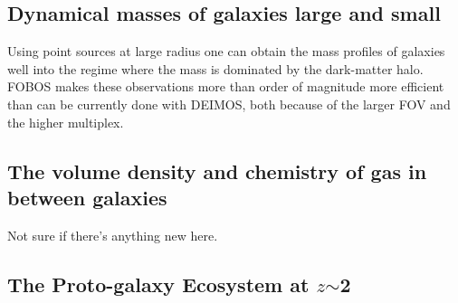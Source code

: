 
\subsection{Dynamical masses of galaxies large and small}

Using point sources at large radius one can obtain the mass profiles of galaxies well into the regime where the mass is dominated by the dark-matter halo.  FOBOS makes these observations more than order of magnitude more efficient than can be currently done with DEIMOS, both because of the larger FOV and the higher multiplex. 

\noindent{}

\subsection{The volume density and chemistry of gas in between galaxies}

Not sure if there's anything new here.

\noindent{}

\noindent{}

\subsection{The Proto-galaxy Ecosystem at $z$$\sim$2}
\label{sec:galaxies}

%
%
%
%


